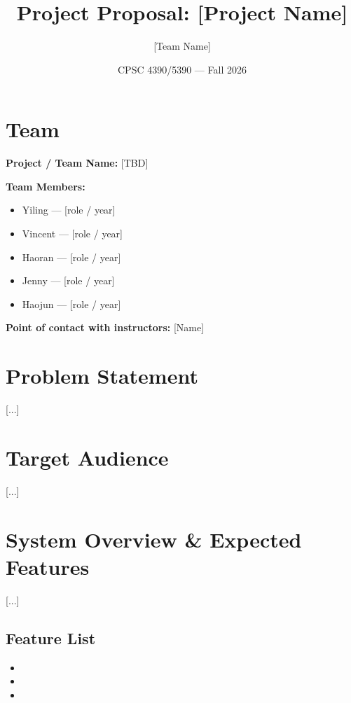 \documentclass[11pt]{article}
\title{Project Proposal: [Project Name]}
\author{[Team Name]}
\date{CPSC 4390/5390 --- Fall 2026}
\newcommand{\yiling}[1]{\textcolor{red}{[Yiling: #1]}}
\begin{document}
\maketitle


\section{Team}

\textbf{Project / Team Name:} [TBD]

\textbf{Team Members:}
\begin{itemize}[nosep]
    \item Yiling --- [role / year]
    \item Vincent --- [role / year]
    \item Haoran --- [role / year]
    \item Jenny --- [role / year]
    \item Haojun --- [role / year]
\end{itemize}

\textbf{Point of contact with instructors:} [Name]

\section{Problem Statement}
[...]

\section{Target Audience}
[...]

\section{System Overview \& Expected Features}
[...]

\subsection{Feature List}
\begin{itemize}
    \item [Feature 1]
    \item [Feature 2]
    \item [Feature 3]
\end{itemize}
\end{document}
